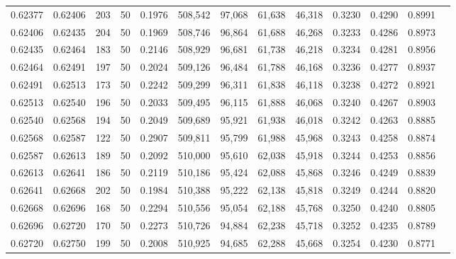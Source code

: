\begin{tabular}{rrrrrrrrrrrrr}
0.62377 & 0.62406 &   203 &  50 &                                     0.1976 & 508,542 &  97,068 &  61,638 &  46,318 & 0.3230 & 0.4290 & 0.8991 \\
0.62406 & 0.62435 &   204 &  50 &                                     0.1969 & 508,746 &  96,864 &  61,688 &  46,268 & 0.3233 & 0.4286 & 0.8973 \\
0.62435 & 0.62464 &   183 &  50 &                                     0.2146 & 508,929 &  96,681 &  61,738 &  46,218 & 0.3234 & 0.4281 & 0.8956 \\
0.62464 & 0.62491 &   197 &  50 &                                     0.2024 & 509,126 &  96,484 &  61,788 &  46,168 & 0.3236 & 0.4277 & 0.8937 \\
0.62491 & 0.62513 &   173 &  50 &                                     0.2242 & 509,299 &  96,311 &  61,838 &  46,118 & 0.3238 & 0.4272 & 0.8921 \\
0.62513 & 0.62540 &   196 &  50 &                                     0.2033 & 509,495 &  96,115 &  61,888 &  46,068 & 0.3240 & 0.4267 & 0.8903 \\
0.62540 & 0.62568 &   194 &  50 &                                     0.2049 & 509,689 &  95,921 &  61,938 &  46,018 & 0.3242 & 0.4263 & 0.8885 \\
0.62568 & 0.62587 &   122 &  50 &                                     0.2907 & 509,811 &  95,799 &  61,988 &  45,968 & 0.3243 & 0.4258 & 0.8874 \\
0.62587 & 0.62613 &   189 &  50 &                                     0.2092 & 510,000 &  95,610 &  62,038 &  45,918 & 0.3244 & 0.4253 & 0.8856 \\
0.62613 & 0.62641 &   186 &  50 &                                     0.2119 & 510,186 &  95,424 &  62,088 &  45,868 & 0.3246 & 0.4249 & 0.8839 \\
0.62641 & 0.62668 &   202 &  50 &                                     0.1984 & 510,388 &  95,222 &  62,138 &  45,818 & 0.3249 & 0.4244 & 0.8820 \\
0.62668 & 0.62696 &   168 &  50 &                                     0.2294 & 510,556 &  95,054 &  62,188 &  45,768 & 0.3250 & 0.4240 & 0.8805 \\
0.62696 & 0.62720 &   170 &  50 &                                     0.2273 & 510,726 &  94,884 &  62,238 &  45,718 & 0.3252 & 0.4235 & 0.8789 \\
0.62720 & 0.62750 &   199 &  50 &                                     0.2008 & 510,925 &  94,685 &  62,288 &  45,668 & 0.3254 & 0.4230 & 0.8771 \\

\end{tabular}
